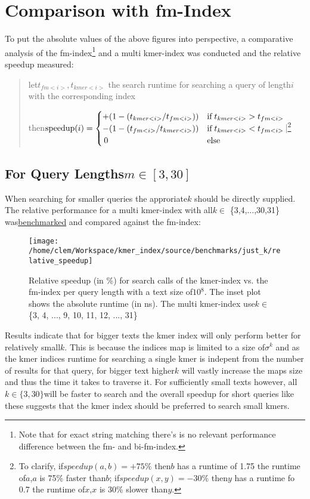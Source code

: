 \section{Comparison with fm-Index}

To put the absolute values of the above figures into perspective,
a comparative analysis of the fm-index\footnote{Note that for exact string matching there's is no relevant performance
difference between the fm- and bi-fm-index.} and a multi kmer-index was conducted and the relative speedup measured:
\begin{verse}
let$t_{fm<i>},t_{kmer<i>}$ the search runtime for searching a query
of length$i$ with the corresponding index

then$\text{{speedup}}(i)=\begin{cases}
+(1-(t_{kmer<i>}/t_{fm<i>})) & \text{{if}\;}t_{kmer<i>}>t_{fm<i>}\\
-(1-(t_{fm<i>}/t_{kmer<i>})) & \text{{if}\;}t_{kmer<i>}<t_{fm<i>}\\
\,0 & \text{{else}}
\end{cases}$|\footnote{To clarify, if$speedup(a,b)=+75\%$ then$b$ has a runtime of 1.75
the runtime of$a$,$a$ is 75\% faster than$b$; if$speedup(x,y)=-30\%$
then$y$ has a runtime fo 0.7 the runtime of$x$,$x$ is 30\% slower
than$y$.}
\end{verse}

\subsection{For Query Lengths$m\in[3,30]$}

When searching for smaller queries the approriate$k$ should be directly
supplied. The relative performance for a multi kmer-index with all$k\in$
\{3,4,...,30,31\} was\href{https://github.com/google/benchmark}{benchmarked}
and compared against the fm-index:

\begin{figure}[H]
\texttt{[image: /home/clem/Workspace/kmer\_index/source/benchmarks/just\_k/relative\_speedup]}

\caption{Relative speedup (in \%) for search calls of the kmer-index vs. the
fm-index per query length with a text size of$10{{}^8}$. The inset
plot shows the absolute runtime (in ns). The multi kmer-index use$k\in$
\{3, 4, ..., 9, 10, 11, 12, ..., 31\}}
\end{figure}

Results indicate that for bigger texts the kmer index will only perform
better for relatively small$k$. This is because the indices map is
limited to a size of$\sigma^{k}$ and as the kmer indices runtime
for searching a single kmer is indepent from the number of results
for that query, for bigger text higher$k$ will vastly increase the
maps size and thus the time it takes to traverse it. For sufficiently
small texts however, all$k\in\{3,30\}$will be faster to search and
the overall speedup for short queries like these suggests that the
kmer index should be preferred to search small kmers.

